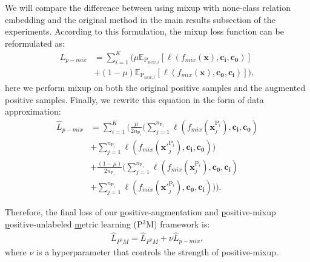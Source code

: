 \documentclass[letterpaper]{article} %
\begin{document}
We will compare the difference between using mixup with none-class relation embedding and the original method in the main results subsection of the experiments.
According to this formulation, the mixup loss function can be reformulated as:
\begin{equation}
\begin{aligned}\label{eq12}
L_{p-mix} &= \sum_{i=1}^{K} (\mu \mathbb{E}_{\mathrm{P}_{new,i}}[ \ell(f_{mix}(\boldsymbol{x}), \boldsymbol{c_{i}}, \boldsymbol{c_{0}})] \\&+ (1-\mu) \mathbb{E}_{\mathrm{P}_{new,i}}[ \ell(f_{mix}(\boldsymbol{x}), \boldsymbol{c_{0}}, \boldsymbol{c_{i}})]),
\end{aligned}
\end{equation}
here we perform mixup on both the original positive samples and the augmented positive samples. Finally, we rewrite this equation in the form of data approximation:
\begin{equation}
\begin{aligned}\label{eq13}
\widehat{L}_{p-mix} &= \sum_{i=1}^{K} (\frac{\mu}{2n_{\mathrm{P}_{i}}} (\sum_{j=1}^{n_{\mathrm{P}_{i}}}\ell(f_{mix}(\boldsymbol{x}_{j}^{\mathrm{P}_{i}}), \boldsymbol{c_{i}}, \boldsymbol{c_{0}}) \\&+ \sum_{j=1}^{n_{\mathrm{P}_{i}}} \ell(f_{mix}(\boldsymbol{x'}_{j}^{\mathrm{P}_{i}}), \boldsymbol{c_{i}}, \boldsymbol{c_{0}})) \\&+ \frac{(1-\mu)}{2n_{\mathrm{P}_{i}}} (\sum_{j=1}^{n_{\mathrm{P}_{i}}}\ell(f_{mix}(\boldsymbol{x}_{j}^{\mathrm{P}_{i}}), \boldsymbol{c_{0}}, \boldsymbol{c_{i}}) \\&+ \sum_{j=1}^{n_{\mathrm{P}_{i}}} \ell(f_{mix}(\boldsymbol{x'}_{j}^{\mathrm{P}_{i}}), \boldsymbol{c_{0}}, \boldsymbol{c_{i}}))).
\end{aligned}
\end{equation}

Therefore, the final loss of our \underline{p}ositive-augmentation and \underline{p}ositive-mixup \underline{p}ositive-unlabeled \underline{m}etric learning (P$^{3}$M) framework is:
\begin{equation}
\begin{aligned}\label{eq14}
\widehat{L}_{P^{3}M} = \widehat{L}_{P^{2}M} + \nu \widehat{L}_{p-mix},
\end{aligned}
\end{equation}
where $\nu$ is a hyperparameter that controls the strength of positive-mixup.
\end{document}
